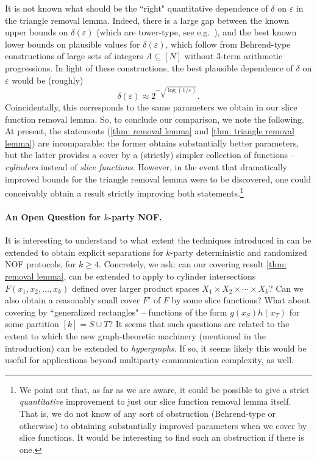 \documentclass[11pt]{article}
\newcommand{\1}{ \mathbbm{1}}
\newcommand{\eps}{\varepsilon}
\begin{document}
It is not known what should be the ``right" quantitative dependence of $\delta$ on $\eps$ in the triangle removal lemma. Indeed, there is a large gap between the known upper bounds on $\delta(\eps)$ (which are tower-type, see e.g.\ \cite{fox2011new}), and the best known lower bounds on plausible values for $\delta(\eps)$, which follow from Behrend-type constructions of large sets of integers $A \subseteq [N]$ without $3$-term arithmetic progressions. In light of these constructions, the best plausible dependence of $\delta$ on $\eps$ would be (roughly) 
$$ \delta(\eps) \approx 2^{-\sqrt{\log(1/\eps)}}. $$
Coincidentally, this corresponds to the same parameters we obtain in our slice function removal lemma. So, to conclude our comparison, we note the following. At present, the statements (\cref{thm: removal lemma} and \cref{thm: triangle removal lemma}) are incomparable: the former obtains substantially better parameters, but the latter provides a cover by a (strictly) simpler collection of functions -- \emph{cylinders} instead of \emph{slice functions}. However, in the event that dramatically improved bounds for the triangle removal lemma were to be discovered, one could conceivably obtain a result strictly improving both statements.\footnote{We point out that, as far as we are aware, it could be possible to give a strict \emph{quantitative} improvement to just our slice function removal lemma itself. That is, we do not know of any sort of obstruction (Behrend-type or otherwise) to obtaining substantially improved parameters when we cover by slice functions. It would be interesting to find such an obstruction if there is one.}

\paragraph{An Open Question for $k$-party NOF.}
It is interesting to understand to what extent the techniques introduced in \cite{KelleyLM2024-nof} can be extended to obtain explicit separations for $k$-party deterministic and randomized NOF protocols, for $k \geq 4$. Concretely, we ask: can our covering result \cref{thm: removal lemma}, can be extended to apply to cylinder intersections $F(x_1, x_2, \ldots, x_k)$ defined over larger product spaces $X_1 \times X_2 \times \cdots \times X_k$? Can we also obtain a reasonably small cover $F'$ of $F$ by some slice functions? What about covering by ``generalized rectangles" -- functions of the form $g(x_{S})h(x_{T})$ for some partition $[k] = S \cup T$?
It seems that such questions are related to the extent to which the new graph-theoretic machinery (mentioned in the introduction) can be extended to \emph{hypergraphs}. If so, it seems likely this would be useful for applications beyond multiparty communication complexity, as well. 
\end{document}
